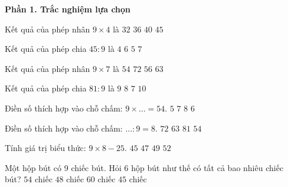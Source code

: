 \textbf{Phần 1. Trắc nghiệm lựa chọn}

\begin{ex} %
Kết quả của phép nhân $9 \times 4$ là
\choice
{$32$}
{\True $36$}
{$40$}
{$45$}
\end{ex}

\begin{ex} %
Kết quả của phép chia $45 : 9$ là
\choice
{$4$}
{$6$}
{\True $5$}
{$7$}
\end{ex}

\begin{ex} %
Kết quả của phép nhân $9 \times 7$ là
\choice
{$54$}
{$72$}
{$56$}
{\True $63$}
\end{ex}

\begin{ex} %
Kết quả của phép chia $81 : 9$ là
\choice
{\True $9$}
{$8$}
{$7$}
{$10$}
\end{ex}

\begin{ex} %
Điền số thích hợp vào chỗ chấm: $9 \times \dots = 54$.
\choice
{$5$}
{$7$}
{$8$}
{\True $6$}
\end{ex}

\begin{ex} %
Điền số thích hợp vào chỗ chấm: $\dots : 9 = 8$.
\choice
{\True $72$}
{$63$}
{$81$}
{$54$}
\end{ex}

\begin{ex} %
Tính giá trị biểu thức: $9 \times 8 - 25$.
\choice
{$45$}
{\True $47$}
{$49$}
{$52$}
\end{ex}

\begin{ex} %
Một hộp bút có 9 chiếc bút. Hỏi 6 hộp bút như thế có tất cả bao nhiêu chiếc bút?
\choice
{\True $54$ chiếc}
{$48$ chiếc}
{$60$ chiếc}
{$45$ chiếc}
\end{ex}

